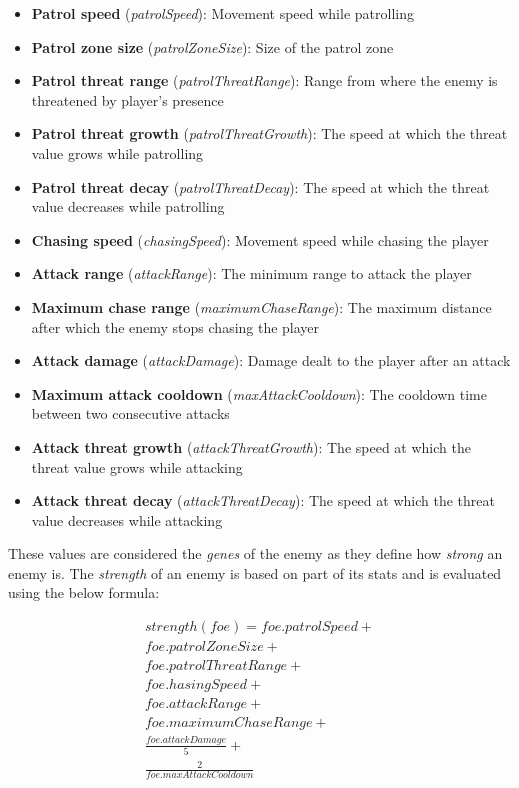 \documentclass[11pt]{article}
\begin{document}
\begin{itemize}
  \item \textbf{Patrol speed} (\textit{patrolSpeed}): Movement speed while patrolling
  \item \textbf{Patrol zone size} (\textit{patrolZoneSize}): Size of the patrol zone
  \item \textbf{Patrol threat range} (\textit{patrolThreatRange}): Range from where the enemy is threatened by player's presence
  \item \textbf{Patrol threat growth} (\textit{patrolThreatGrowth}): The speed at which the threat value grows while patrolling
  \item \textbf{Patrol threat decay} (\textit{patrolThreatDecay}): The speed at which the threat value decreases while patrolling

  \item \textbf{Chasing speed} (\textit{chasingSpeed}): Movement speed while chasing the player
  \item \textbf{Attack range} (\textit{attackRange}): The minimum range to attack the player
  \item \textbf{Maximum chase range} (\textit{maximumChaseRange}): The maximum distance after which the enemy stops chasing the player
  \item \textbf{Attack damage} (\textit{attackDamage}): Damage dealt to the player after an attack
  \item \textbf{Maximum attack cooldown} (\textit{maxAttackCooldown}): The cooldown time between two consecutive attacks
  \item \textbf{Attack threat growth} (\textit{attackThreatGrowth}): The speed at which the threat value grows while attacking
  \item \textbf{Attack threat decay} (\textit{attackThreatDecay}): The speed at which the threat value decreases while attacking
\end{itemize}

These values are considered the \textit{genes} of the enemy as they define how \textit{strong} an enemy is. The \textit{strength} of an enemy is based on part of its stats and is evaluated using the below formula:

\begin{gather*}
  strength(foe) =
    foe.patrolSpeed + \\
    foe.patrolZoneSize + \\
    foe.patrolThreatRange + \\
    foe.hasingSpeed + \\
    foe.attackRange + \\
    foe.maximumChaseRange + \\
    \frac{foe.attackDamage}{5} + \\
    \frac{2}{foe.maxAttackCooldown}
\end{gather*}
\end{document}
